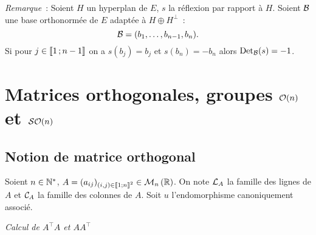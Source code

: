 \emph{Remarque}~: Soient \(H\) un hyperplan de \(E\), \(s\) la réflexion par 
rapport à \(H\). Soient \(\mathcal{B}\) une base orthonormée de \(E\) adaptée à 
\(H\oplus H^\perp\)~:
\begin{equation}
  \mathcal{B}=(b_1, \dotsc, b_{n-1}, b_n).
\end{equation}
Si pour \(j \in \mathopen{\llbracket}1\mathclose{}\mathpunct{};n-1\mathclose{\rrbracket}\) on a \(s(b_j)=b_j\) et 
\(s(b_n)=-b_n\) alors \(\operatorname{Det}_{\mathcal{B}}(s)=-1\).

\section{Matrices orthogonales, groupes \(\mathcal{O}\!\left(n\right)\) et \(\mathcal{SO}\!\left(n\right)\)}

\subsection{Notion de matrice orthogonal}

Soient \(n \in \mathbb{N}^*\), \(A=(a_{ij})_{(i,j) \in \mathopen{\llbracket}1\mathclose{}\mathpunct{};n\mathclose{\rrbracket}^2} \in 
\mathcal{M}_{n}\left(\mathbb{R}\right)\). On note \(\mathcal{L}_A\) la famille des lignes de \(A\) et 
\(\mathcal{C}_A\) la famille des colonnes de \(A\). Soit \(u\) l'endomorphisme 
canoniquement associé.

\emph{Calcul de \(A^\top A\) et \(A A^\top\)}

